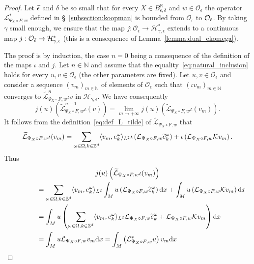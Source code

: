 \documentclass[AHL,Unicode,longabstracts,published]{cedram}
\newcommand{\p}[1]{\left(#1\right)}
\newcommand{\brac}[1]{\langle #1 \rangle}
\newcommand{\clO}{\mathcal{O}}
\newcommand{\clL}{\mathcal{L}}
\newcommand{\clH}{\mathcal{H}}
\newcommand{\clK}{\mathcal{K}}
\newcommand{\bbZ}{\mathbb{Z}}
\newcommand{\bbN}{\mathbb{N}}
\newcommand{\bbR}{\mathbb{R}}
\newcommand{\rmd}{\mathrm{d}}
\let\oldtilde\tilde
\renewcommand*{\tilde}[1]{\mathchoice{\widetilde{#1}}{\widetilde{#1}}{\oldtilde{#1}}{\oldtilde{#1}}}
\newcommand{\clO}{\mathcal{O}}
\begin{document}
\begin{proof}
Let $\tilde{\epsilon}$ and $\delta$ be so small that for every $X \in B_{\epsilon,\delta}^{\bbR}$ and $w \in \clO_\epsilon$ the operator $\clL_{\Psi_X \circ F,w}^*$ defined in \S~\ref{subsection:koopman} is bounded from $\clO_\epsilon$ to $\clO_{\tilde{\epsilon}}$. By taking $\gamma$ small enough, we ensure that the map $j : \clO_\epsilon \to \clH_{\gamma,\epsilon}^*$ extends to a continuous map $j : \clO_{\tilde{\epsilon}} \to \clH_{\gamma,\epsilon}^*$ (this is a consequence of Lemma~\ref{lemma:dual_ekomega}).

The proof is by induction, the case $n = 0$ being a consequence of the definition of the maps $\iota$ and $j$. Let $n \in \bbN$ and assume that the equality~\eqref{eq:natural_inclusion} holds for every $u,v \in \clO_\epsilon$ (the other parameters are fixed). Let $u,v \in \clO_\epsilon$ and consider a sequence $(v_m)_{m \in \bbN}$ of elements of $\clO_\epsilon$ such that $(\iota v_m)_{m \in \bbN}$ converges to $\widetilde{\clL}_{\Psi_X \circ F,w}^n \iota v$ in $\clH_{\gamma,\epsilon}$. We have consequently
\begin{equation*}
j(u)\p{\widetilde{\clL}_{\Psi_X \circ F,w}^{n+1} \iota(v)} = \lim_{m \to + \infty} j(u)\p{\widetilde{\clL}_{\Psi_X \circ F,w} \iota(v_m)}.
\end{equation*}
It follows from the definition~\eqref{eq:def_L_tilde} of $\widetilde{\clL}_{\Psi_X \circ F,w}$ that
\begin{equation*}
\widetilde{\clL}_{\Psi_X \circ F,w} \iota(v_m) = \sum_{\omega \in \Omega, k  \in \bbZ^d} \brac{v_m,e_k^\omega}_{L^2} \iota\p{ \clL_{\Psi_X \circ F,w} \tilde{e}_{k}^\omega} + \iota\p{\clL_{\Psi_X \circ F,w} \clK v_m}.
\end{equation*}
Thus
\begin{multline*}
 j(u)\p{\widetilde{\clL}_{\Psi_X \circ F,w} \iota(v_m)} \\
 \begin{aligned}
& \qquad \qquad = \sum_{\omega \in \Omega, k \in \bbZ^d} \brac{v_m,e_k^\omega}_{L^2} \int_M u\p{ \clL_{\Psi_X \circ F,w} \tilde{e}_{k}^\omega} \rmd x + \int_M u \p{\clL_{\Psi_X \circ F,w} \clK v_m} \rmd x \\
& \qquad \qquad = \int_M u \p{\sum_{\omega \in \Omega, k \in \bbZ^d} \brac{v_m,e_k^\omega}_{L^2} \clL_{\Psi_X \circ F,w} \tilde{e}_{k}^\omega + \clL_{\Psi_X \circ F,w} \clK v_m} \rmd x \\
& \qquad \qquad = \int_M u \clL_{\Psi_X \circ F,w} v_m \rmd x = \int_M \left(\clL_{\Psi_X \circ F,w}^* u\right)v_m \rmd x \\

\end{aligned}
\end{multline*}
\end{proof}
\end{document}
